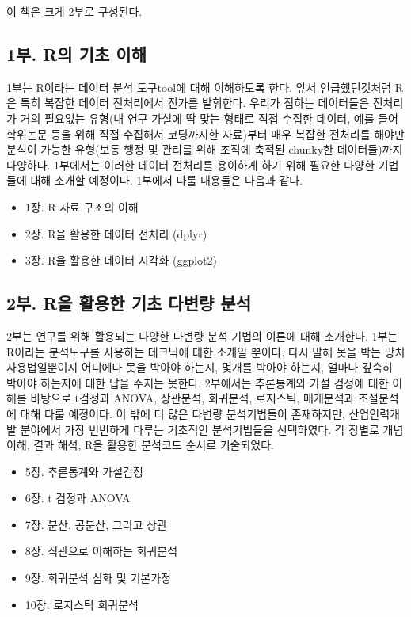 \documentclass[
]{book}
\providecommand{\tightlist}{%
  \setlength{\itemsep}{0pt}\setlength{\parskip}{0pt}}
\begin{document}
이 책은 크게 2부로 구성된다.

\subsection*{1부. R의 기초 이해}\label{uxbd80.-ruxc758-uxae30uxcd08-uxc774uxd574}

1부는 R이라는 데이터 분석 도구tool에 대해 이해하도록 한다. 앞서 언급했던것처럼 R은 특히 복잡한 데이터 전처리에서 진가를 발휘한다. 우리가 접하는 데이터들은 전처리가 거의 필요없는 유형(내 연구 가설에 딱 맞는 형태로 직접 수집한 데이터, 예를 들어 학위논문 등을 위해 직접 수집해서 코딩까지한 자료)부터 매우 복잡한 전처리를 해야만 분석이 가능한 유형(보통 행정 및 관리를 위해 조직에 축적된 chunky한 데이터들)까지 다양하다. 1부에서는 이러한 데이터 전처리를 용이하게 하기 위해 필요한 다양한 기법들에 대해 소개할 예정이다. 1부에서 다룰 내용들은 다음과 같다.

\begin{itemize}
\tightlist
\item
  1장. R 자료 구조의 이해
\item
  2장. R을 활용한 데이터 전처리 (dplyr)
\item
  3장. R을 활용한 데이터 시각화 (ggplot2)
\end{itemize}

\subsection*{2부. R을 활용한 기초 다변량 분석}\label{uxbd80.-ruxc744-uxd65cuxc6a9uxd55c-uxae30uxcd08-uxb2e4uxbcc0uxb7c9-uxbd84uxc11d}

2부는 연구를 위해 활용되는 다양한 다변량 분석 기법의 이론에 대해 소개한다. 1부는 R이라는 분석도구를 사용하는 테크닉에 대한 소개일 뿐이다. 다시 말해 못을 박는 망치 사용법일뿐이지 어디에다 못을 박아야 하는지, 몇개를 박아야 하는지, 얼마나 깊숙히 박아야 하는지에 대한 답을 주지는 못한다. 2부에서는 추론통계와 가설 검정에 대한 이해를 바탕으로 t검정과 ANOVA, 상관분석, 회귀분석, 로지스틱, 매개분석과 조절분석에 대해 다룰 예정이다. 이 밖에 더 많은 다변량 분석기법들이 존재하지만, 산업인력개발 분야에서 가장 빈번하게 다루는 기초적인 분석기법들을 선택하였다. 각 장별로 개념이해, 결과 해석, R을 활용한 분석코드 순서로 기술되었다.

\begin{itemize}
\tightlist
\item
  5장. 추론통계와 가설검정
\item
  6장. t 검정과 ANOVA
\item
  7장. 분산, 공분산, 그리고 상관
\item
  8장. 직관으로 이해하는 회귀분석
\item
  9장. 회귀분석 심화 및 기본가정
\item
  10장. 로지스틱 회귀분석
\end{itemize}
\end{document}
